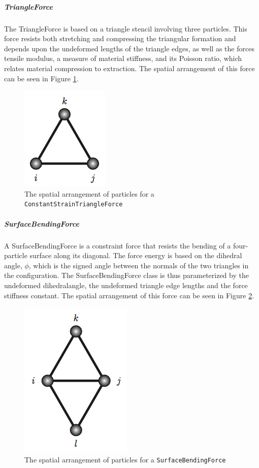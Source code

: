 \subparagraph{TriangleForce}

The TriangleForce is based on a triangle stencil
involving three particles. This force resists both stretching and
compressing the triangular formation and depends upon the undeformed
lengths of the triangle edges, as well as the forces tensile modulus,
a measure of material stiffness, and its Poisson ratio, which relates
material compression to extraction. The spatial arrangement of this
force can be seen in Figure \ref{fig:trianglef}.

\begin{figure}
  \centering
  \includegraphics{figures/Triangle}
  \caption{The spatial arrangement of particles for a \texttt{ConstantStrainTriangleForce}}
  \label{fig:trianglef}
\end{figure}

\subparagraph{SurfaceBendingForce}

A SurfaceBendingForce is a constraint force that resists the bending
of a four-particle surface along its diagonal. The force energy is
based on the dihedral angle, $\phi$, which is the signed angle between
the normals of the two triangles in the configuration. The
SurfaceBendingForce class is thus parameterized by the undeformed
dihedralangle, the undeformed triangle edge lengths and the force
stiffness constant. The spatial arrangement of this force can be seen
in Figure \ref{fig:surfacef}.

\begin{figure}
  \centering
  \includegraphics{figures/SurfaceBending}
  \caption{The spatial arrangement of particles for a \texttt{SurfaceBendingForce}}
  \label{fig:surfacef}
\end{figure}

